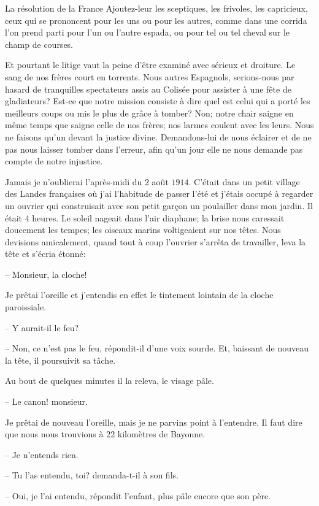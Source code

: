 \begin{chapter}{La résolution de la France}
Ajoutez-leur les sceptiques, les frivoles, les capricieux, ceux qui se
prononcent pour les uns ou pour les autres, comme dans une corrida
l'on prend parti pour l'un ou l'autre espada, ou pour tel ou tel
cheval sur le champ de courses.

Et pourtant le litige vaut la peine d'être examiné avec sérieux et
droiture. Le sang de nos frères court en torrents. Nous autres
Espagnols, serions-nous par hasard de tranquilles spectateurs assis au
Colisée pour assister à une fête de gladiateurs? Est-ce que notre
mission consiste à dire quel est celui qui a porté les meilleurs coups
ou mis le plus de grâce à tomber? Non; notre chair saigne en même temps
que saigne celle de nos frères; nos larmes coulent avec les leurs. Nous
ne faisons qu'un devant la justice divine. Demandons-lui de nous
éclairer et de ne pas nous laisser tomber dans l'erreur, afin qu'un jour
elle ne nous demande pas compte de notre injustice.

\horizontalLine

Jamais je n'oublierai l'après-midi du $2$ août $1914$. C'était dans un petit
village des Landes françaises où j'ai l'habitude de passer l'été et
j'étais occupé à regarder un ouvrier qui construisait avec son petit
garçon un poulailler dans mon jardin. Il était 4 heures. Le soleil
nageait dans l'air diaphane; la brise nous caressait doucement les
tempes; les oiseaux marins voltigeaient sur nos têtes. Nous devisions
amicalement, quand tout à coup l'ouvrier s'arrêta de travailler, leva la
tête et s'écria étonné:

--  Monsieur, la cloche!

Je prêtai l'oreille et j'entendis en effet le tintement lointain de la
cloche paroissiale.

--  Y aurait-il le feu?

--  Non, ce n'est pas le feu, répondit-il d'une voix sourde. Et, baissant
de nouveau la tête, il poursuivit sa tâche.

Au bout de quelques minutes il la releva, le visage pâle.

--  Le canon! monsieur.

Je prêtai de nouveau l'oreille, mais je ne parvins point à l'entendre.
Il faut dire que nous nous trouvions à 22 kilomètres de Bayonne.

--  Je n'entends rien.

--  Tu l'as entendu, toi? demanda-t-il à son fils.

--  Oui, je l'ai entendu, répondit l'enfant, plus pâle encore que son
père.


\end{chapter}
